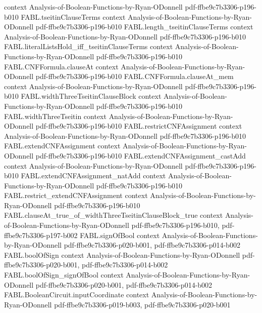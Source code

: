 \begin{theorem}
  {context}
  {Analysis-of-Boolean-Functions-by-Ryan-ODonnell}
  {pdf-ffbe9c7b3306-p196-b010}
\proofstep
  {FABL.tseitinClauseTerms}
  {context}
  {Analysis-of-Boolean-Functions-by-Ryan-ODonnell}
  {pdf-ffbe9c7b3306-p196-b010}
\proofstep
  {FABL.length_tseitinClauseTerms}
  {context}
  {Analysis-of-Boolean-Functions-by-Ryan-ODonnell}
  {pdf-ffbe9c7b3306-p196-b010}
\proofstep
  {FABL.literalListsHold_iff_tseitinClauseTerms}
  {context}
  {Analysis-of-Boolean-Functions-by-Ryan-ODonnell}
  {pdf-ffbe9c7b3306-p196-b010}
\proofstep
  {FABL.CNFFormula.clauseAt}
  {context}
  {Analysis-of-Boolean-Functions-by-Ryan-ODonnell}
  {pdf-ffbe9c7b3306-p196-b010}
\proofstep
  {FABL.CNFFormula.clauseAt_mem}
  {context}
  {Analysis-of-Boolean-Functions-by-Ryan-ODonnell}
  {pdf-ffbe9c7b3306-p196-b010}
\proofstep
  {FABL.widthThreeTseitinClauseBlock}
  {context}
  {Analysis-of-Boolean-Functions-by-Ryan-ODonnell}
  {pdf-ffbe9c7b3306-p196-b010}
\proofstep
  {FABL.widthThreeTseitin}
  {context}
  {Analysis-of-Boolean-Functions-by-Ryan-ODonnell}
  {pdf-ffbe9c7b3306-p196-b010}
\proofstep
  {FABL.restrictCNFAssignment}
  {context}
  {Analysis-of-Boolean-Functions-by-Ryan-ODonnell}
  {pdf-ffbe9c7b3306-p196-b010}
\proofstep
  {FABL.extendCNFAssignment}
  {context}
  {Analysis-of-Boolean-Functions-by-Ryan-ODonnell}
  {pdf-ffbe9c7b3306-p196-b010}
\proofstep
  {FABL.extendCNFAssignment_castAdd}
  {context}
  {Analysis-of-Boolean-Functions-by-Ryan-ODonnell}
  {pdf-ffbe9c7b3306-p196-b010}
\proofstep
  {FABL.extendCNFAssignment_natAdd}
  {context}
  {Analysis-of-Boolean-Functions-by-Ryan-ODonnell}
  {pdf-ffbe9c7b3306-p196-b010}
\proofstep
  {FABL.restrict_extendCNFAssignment}
  {context}
  {Analysis-of-Boolean-Functions-by-Ryan-ODonnell}
  {pdf-ffbe9c7b3306-p196-b010}
\proofstep
  {FABL.clauseAt_true_of_widthThreeTseitinClauseBlock_true}
  {context}
  {Analysis-of-Boolean-Functions-by-Ryan-ODonnell}
  {pdf-ffbe9c7b3306-p196-b010,
    pdf-ffbe9c7b3306-p197-b002}
\proofstep
  {FABL.signOfBool}
  {context}
  {Analysis-of-Boolean-Functions-by-Ryan-ODonnell}
  {pdf-ffbe9c7b3306-p020-b001,
    pdf-ffbe9c7b3306-p014-b002}
\proofstep
  {FABL.boolOfSign}
  {context}
  {Analysis-of-Boolean-Functions-by-Ryan-ODonnell}
  {pdf-ffbe9c7b3306-p020-b001,
    pdf-ffbe9c7b3306-p014-b002}
\proofstep
  {FABL.boolOfSign_signOfBool}
  {context}
  {Analysis-of-Boolean-Functions-by-Ryan-ODonnell}
  {pdf-ffbe9c7b3306-p020-b001,
    pdf-ffbe9c7b3306-p014-b002}
\proofstep
  {FABL.BooleanCircuit.inputCoordinate}
  {context}
  {Analysis-of-Boolean-Functions-by-Ryan-ODonnell}
  {pdf-ffbe9c7b3306-p019-b003,
    pdf-ffbe9c7b3306-p020-b001}

\end{theorem}
